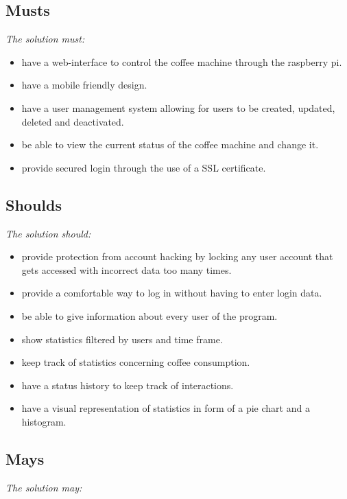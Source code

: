 \subsection{Musts}

\textit{The solution must:}

\begin{itemize}
\item have a web-interface to control the coffee machine through the raspberry pi.
\item have a mobile friendly design.
\item have a user management system allowing for users to be created, updated, deleted and deactivated.
\item be able to view the current status of the coffee machine and change it.
\item provide secured login through the use of a SSL certificate.
\end{itemize}

\subsection{Shoulds}

\textit{The solution should:}

\begin{itemize}
\item provide protection from account hacking by locking any user account that gets accessed with incorrect data too many times.
\item provide a comfortable way to log in without having to enter login data.
\item be able to give information about every user of the program.
\item show statistics filtered by users and time frame.
\item keep track of statistics concerning coffee consumption.
\item have a status history to keep track of interactions.
\item have a visual representation of statistics in form of a pie chart and a histogram.
\end{itemize}

\clearpage

\subsection{Mays}

\textit{The solution may:}

